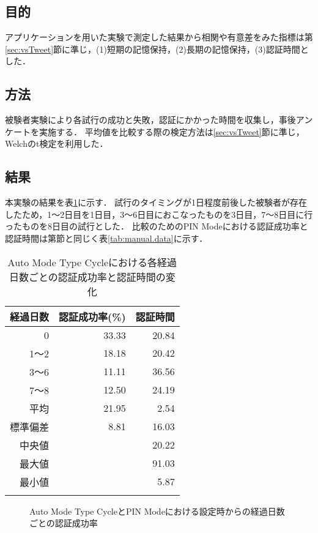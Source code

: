\subsection{目的}
アプリケーションを用いた実験で測定した結果から相関や有意差をみた指標は第\ref{sec:vsTweet}節に準じ，(1)短期の記憶保持，(2)長期の記憶保持，(3)認証時間とした．

\subsection{方法}
被験者実験により各試行の成功と失敗，認証にかかった時間を収集し，事後アンケートを実施する．
平均値を比較する際の検定方法は\ref{sec:vsTweet}節に準じ，Welchのt検定を利用した．

\subsection{結果}
本実験の結果を表\ref{tab:auto_cycle.data}に示す．
試行のタイミングが1日程度前後した被験者が存在したため，1〜2日目を1日目，3〜6日目におこなったものを3日目，7〜8日目に行ったものを8日目の試行とした．
比較のためのPIN Modeにおける認証成功率と認証時間は第\label{sec:vsManual}節と同じく表\ref{tab:manual.data}に示す．
\begin{table}[ht]
  \caption{Auto Mode Type Cycleにおける各経過日数ごとの認証成功率と認証時間の変化}
  \label{tab:auto_cycle.data}
  \begin{center}
    \small
    \begin{tabular}{rrr}
      \bhline
      経過日数 & 認証成功率(\%) & 認証時間\\ \hline
      0 & 33.33 & 20.84 \\
      1〜2 & 18.18 & 20.42 \\
      3〜6 & 11.11 & 36.56 \\
      7〜8 & 12.50 & 24.19 \\ \hline \hline
      平均 & 21.95 & 2.54 \\
      標準偏差 & 8.81 & 16.03 \\
      中央値 & & 20.22 \\
      最大値 & & 91.03 \\
      最小値 & & 5.87 \\
      \bhline
    \end{tabular}
  \end{center}
\end{table}

\begin{figure}[t]
  \begin{center}
  \end{center}
  \caption{Auto Mode Type CycleとPIN Modeにおける設定時からの経過日数ごとの認証成功率}
  \label{fig:ex_auto_cycle_vs_pin_rate}
\end{figure}

